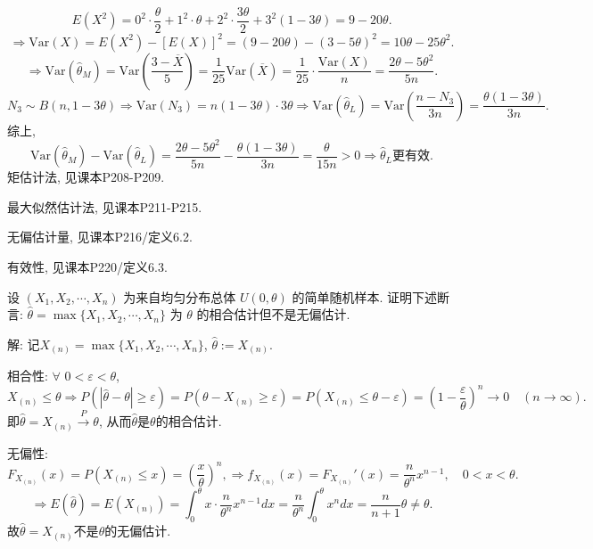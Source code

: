 \documentclass[standard]{ExBook}
\renewenvironment{shaded}{%
  \def\FrameCommand{\fboxsep=\FrameSep \colorbox{shadecolor}}%
  \MakeFramed{\advance\hsize-\width \FrameRestore}%
}{%
  \endMakeFramed
}
\begin{document}
\begin{qitems}
$$
E(X^2)
=
0^2\cdot\frac{\theta}{2}
+1^2\cdot\theta
+2^2\cdot\frac{3\theta}{2}
+3^2(1-3\theta)
=
9-20\theta.
$$
$$
\Longrightarrow
\mathrm{Var}(X)
=
E(X^2)-[E(X)]^2
=
(9-20\theta)-(3-5\theta)^2
=
10\theta-25\theta^2.
$$
$$
\Longrightarrow
\mathrm{Var}(\hat{\theta}_{M})
=
\mathrm{Var}\left(\frac{3-\overline{X}}{5}\right)
=
\frac{1}{25}\mathrm{Var}(\overline{X})
=
\frac{1}{25}\cdot\frac{\mathrm{Var}(X)}{n}
=
\frac{2\theta-5\theta^2}{5n}.
$$
$$
N_3\sim B(n,1-3\theta)
\Longrightarrow
\mathrm{Var}(N_3)
=
n(1-3\theta)\cdot 3\theta
\Longrightarrow
\mathrm{Var}(\hat{\theta}_{L})
=
\mathrm{Var}\left(\frac{n-N_3}{3n}\right)
=
\frac{\theta(1-3\theta)}{3n}.
$$
综上,
$$
\mathrm{Var}(\hat{\theta}_{M})-\mathrm{Var}(\hat{\theta}_{L})
=
\frac{2\theta-5\theta^2}{5n}
-
\frac{\theta(1-3\theta)}{3n}
=
\frac{\theta}{15n}
>0
\Longrightarrow
\hat{\theta}_{L}\text{更有效}.
$$
\textcolor{themeColor}{\selectfont {} 矩估计法, 见课本P208-P209.}

\textcolor{themeColor}{\selectfont {} 最大似然估计法, 见课本P211-P215.}

\textcolor{themeColor}{\selectfont {} 无偏估计量, 见课本P216/定义6.2.}

\textcolor{themeColor}{\selectfont {} 有效性, 见课本P220/定义6.3.}

\vspace{2.5cm-5em}

    \begin{bbox}
    \begin{shaded}
        \qitem
设 \((X_1, X_2, \cdots, X_n)\) 为来自均匀分布总体 \(U(0, \theta)\) 的简单随机样本. 证明下述断言: \(\hat{\theta} = \max\{X_1, X_2, \cdots, X_n\}\) 为 \(\theta\) 的相合估计但不是无偏估计.
    \end{shaded}
    \end{bbox}

\vspace{\dimexpr2.5cm-5em\relax}

解: 记$X_{(n)}=\max\{X_1,X_2,\cdots,X_n\}$, $\hat{\theta}:=X_{(n)}$.

相合性: $\forall$ $0<\varepsilon<\theta$,
$$
X_{(n)}\leq\theta
\Longrightarrow
P(|\hat{\theta}-\theta|\geq\varepsilon)
=
P(\theta-X_{(n)}\geq\varepsilon)
=
P(X_{(n)}\leq\theta-\varepsilon)
=
\left(1-\frac{\varepsilon}{\theta}\right)^n
\to0\quad(n\to\infty).
$$
即$\hat{\theta}=X_{(n)}
\xrightarrow{P}\theta$, 从而$\hat{\theta}$是$\theta$的相合估计.

无偏性:
$$
F_{X_{(n)}}(x)
=
P(X_{(n)}\leq x)
=
\left(\frac{x}{\theta}\right)^n,
\Longrightarrow
f_{X_{(n)}}(x)
=
F_{X_{(n)}}'(x)
=
\frac{n}{\theta^n}x^{n-1},\quad 0<x<\theta.
$$
$$
\Longrightarrow
E(\hat{\theta})
=
E(X_{(n)})
=
\int_{0}^{\theta}x\cdot\frac{n}{\theta^n}x^{n-1}dx
=
\frac{n}{\theta^n}\int_{0}^{\theta}x^n dx
=
\frac{n}{n+1}\theta
\neq\theta.
$$
故$\hat{\theta}=X_{(n)}$不是$\theta$的无偏估计.


\end{qitems}
\end{document}
